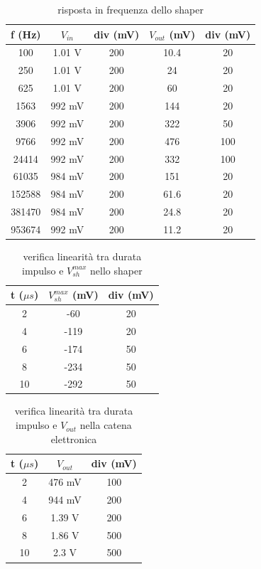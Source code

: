 \documentclass{article}
\begin{document}
\begin{table}[H]
    \centering
    \begin{tabular}{ccccc}
        \toprule
        f (Hz) & $V_{in}$ & div (mV) & $V_{out}$ (mV) & div (mV)\\
        \midrule
        100 & 1.01 V & 200 & 10.4 & 20\\
        250 & 1.01 V& 200 & 24 & 20\\
        625 & 1.01 V& 200 & 60 & 20\\
        1563 & 992 mV & 200 & 144 & 20\\
        3906 & 992 mV & 200 & 322 & 50\\
        9766 & 992 mV & 200 & 476 & 100\\
        24414 & 992 mV & 200 & 332 & 100\\
        61035 & 984 mV & 200 & 151 & 20\\
        152588 & 984 mV & 200 & 61.6 & 20\\
        381470 & 984 mV & 200 & 24.8 & 20\\
        953674 & 992 mV & 200 & 11.2 & 20\\
        \bottomrule
    \end{tabular}
    \caption{risposta in frequenza dello shaper}
\end{table}


\begin{table}[H]
    \centering
    \begin{tabular}{ccc}
        \toprule
        t ($\mu s$) & $V_{sh}^{max}$ (mV) & div (mV) \\
        \midrule
        2 & -60 & 20 \\
        4 & -119 & 20 \\
        6 & -174 & 50 \\
        8 & -234 & 50 \\
        10 & -292 & 50 \\
        \bottomrule
    \end{tabular}
    \caption{verifica linearità tra durata impulso e $V_{sh}^{max}$ nello shaper}
\end{table}


\begin{table}[H]
    \centering
    \begin{tabular}{ccc}
        \toprule
        t ($\mu s$) & $V_{out}$ & div (mV) \\
        \midrule
        2 & 476 mV& 100 \\
        4 & 944 mV& 200 \\
        6 & 1.39 V & 200 \\
        8 & 1.86 V & 500 \\
        10 & 2.3 V & 500 \\
        \bottomrule
    \end{tabular}
    \caption{verifica linearità tra durata impulso e $V_{out}$ nella catena elettronica}
\end{table}
\end{document}
